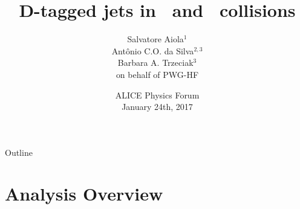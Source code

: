 \documentclass[xcolor={usenames,dvipsnames}]{beamer}
\title[D-tagged jets in \pp\ and \pPb\ collisions] %
{D-tagged jets in \pp\ and \pPb\ collisions}
\author[Salvatore Aiola]%
{Salvatore Aiola$^{1}$ \\
Ant\^onio C.O. da Silva$^{2,3}$ \\
Barbara A. Trzeciak$^{3}$ \\ 
\bigskip
on behalf of PWG-HF}
\institute[Yale University] %
{$^{1}$Yale University\\
$^{2}$University of S\~ao Paulo \\
$^{3}$Utrecht University}
\date[PF - Jan. 24th, 2017] %
{ALICE Physics Forum \\
January 24th, 2017}
\begin{document}
\begin{frame}
  \titlepage
\end{frame}

\begin{frame}{Outline}
    \tableofcontents
 \end{frame}





\section{Analysis Overview}
\end{document}

